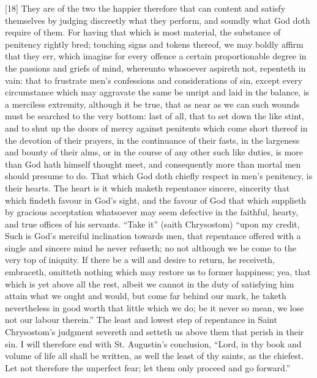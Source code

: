 [18] They are of the two the happier therefore that can content and satisfy themselves by judging discreetly what they perform, and soundly what God doth require of them. For having that which is most material, the substance of penitency rightly bred; touching signs and tokens thereof, we may boldly affirm that they err, which imagine for every offence a certain proportionable degree in the passions and griefs of mind, whereunto whosoever aspireth not, repenteth in vain: that to frustrate men’s confessions and considerations of sin, except every circumstance which may aggravate the same be unript and laid in the balance, is a merciless extremity, although it be true, that as near as we can such wounds must be searched to the very bottom: last of all, that to set down the like stint, and to shut up the doors of mercy against penitents which come short thereof in the devotion of their prayers, in the continuance of their fasts, in the largeness and bounty of their alms, or in the course of any other such like duties, is more than God hath himself thought meet, and consequently more than mortal men should presume to do. That which God doth chiefly respect in men’s penitency, is their hearts. The heart is it which maketh repentance sincere, sincerity that which findeth favour in God’s sight, and the favour of God that which supplieth by gracious acceptation whatsoever may seem defective in the faithful, hearty, and true offices of his servants. “Take it” (saith Chrysostom) “upon my credit, Such is God’s merciful  inclination towards men, that repentance offered with a single and sincere mind he never refuseth; no not although we be come to the very top of iniquity. If there be a will and desire to return, he receiveth, embraceth, omitteth nothing which may restore us to former happiness; yea, that which is yet above all the rest, albeit we cannot in the duty of satisfying him attain what we ought and would, but come far behind our mark, he taketh nevertheless in good worth that little which we do; be it never so mean, we lose not our labour therein.” The least and lowest step of repentance in Saint Chrysostom’s judgment severeth and setteth us above them that perish in their sin. I will therefore end with St. Augustin’s conclusion, “Lord, in thy book and volume of life all shall be written, as well the least of thy saints, as the chiefest. Let not therefore the unperfect fear; let them only proceed and go forward.”

